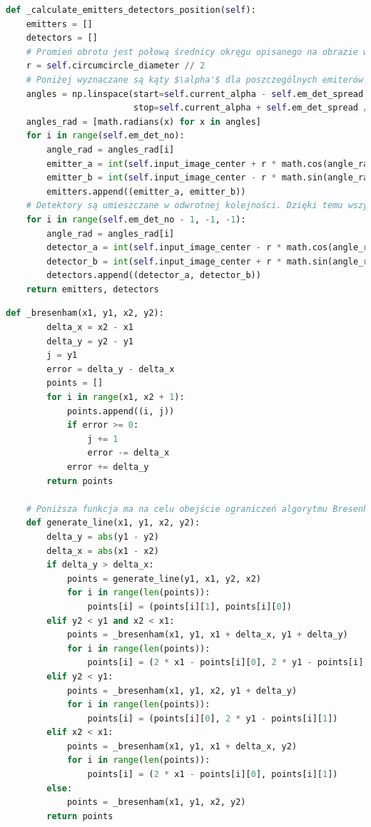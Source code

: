 \documentclass[a4paper]{article}
\begin{document}
\begin{lstlisting}[language=Python, caption=Wyznaczanie położenia emiterów i detektorów, texcl=true]
def _calculate_emitters_detectors_position(self):
    emitters = []
    detectors = []
    # Promień obrotu jest połową średnicy okręgu opisanego na obrazie wejściowym
    r = self.circumcircle_diameter // 2
    # Poniżej wyznaczane są kąty $\alpha'$ dla poszczególnych emiterów i detektorów. Gdy wartość kąta $\alpha'$ emitera zmienimy o pewną wartość $x$, a detektora o wartość $-x$, uzyskamy efekt przesunięcia łączącej je linii względem środka okręgu, jednocześnie nie zmieniając nachylenia tej linii
    angles = np.linspace(start=self.current_alpha - self.em_det_spread / 2,
                         stop=self.current_alpha + self.em_det_spread / 2, num=self.em_det_no)
    angles_rad = [math.radians(x) for x in angles]
    for i in range(self.em_det_no):
        angle_rad = angles_rad[i]
        emitter_a = int(self.input_image_center + r * math.cos(angle_rad))
        emitter_b = int(self.input_image_center - r * math.sin(angle_rad))
        emitters.append((emitter_a, emitter_b))
    # Detektory są umieszczane w odwrotnej kolejności. Dzięki temu wszystkie linie łączące odpowiadające sobie emitery i detektory będą (w danej iteracji) tak samo nachylone
    for i in range(self.em_det_no - 1, -1, -1):
        angle_rad = angles_rad[i]
        detector_a = int(self.input_image_center - r * math.cos(angle_rad))
        detector_b = int(self.input_image_center + r * math.sin(angle_rad))
        detectors.append((detector_a, detector_b))
    return emitters, detectors
\end{lstlisting}

\begin{lstlisting}[language=Python, caption=Algorytm Bresenhama, texcl=true]
    def _bresenham(x1, y1, x2, y2):
        delta_x = x2 - x1
        delta_y = y2 - y1
        j = y1
        error = delta_y - delta_x
        points = []
        for i in range(x1, x2 + 1):
            points.append((i, j))
            if error >= 0:
                j += 1
                error -= delta_x
            error += delta_y
        return points
    
    # Poniższa funkcja ma na celu obejście ograniczeń algorytmu Bresenhama, umożliwiając generowanie dowolnych linii
    def generate_line(x1, y1, x2, y2):
        delta_y = abs(y1 - y2)
        delta_x = abs(x1 - x2)
        if delta_y > delta_x:
            points = generate_line(y1, x1, y2, x2)
            for i in range(len(points)):
                points[i] = (points[i][1], points[i][0])
        elif y2 < y1 and x2 < x1:
            points = _bresenham(x1, y1, x1 + delta_x, y1 + delta_y)
            for i in range(len(points)):
                points[i] = (2 * x1 - points[i][0], 2 * y1 - points[i][1])
        elif y2 < y1:
            points = _bresenham(x1, y1, x2, y1 + delta_y)
            for i in range(len(points)):
                points[i] = (points[i][0], 2 * y1 - points[i][1])
        elif x2 < x1:
            points = _bresenham(x1, y1, x1 + delta_x, y2)
            for i in range(len(points)):
                points[i] = (2 * x1 - points[i][0], points[i][1])
        else:
            points = _bresenham(x1, y1, x2, y2)
        return points
    \end{lstlisting}
\pagebreak
\end{document}
